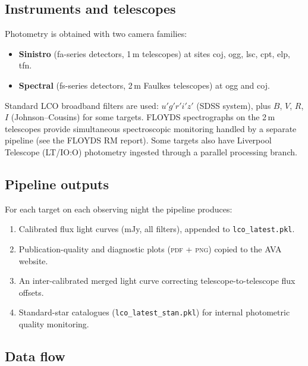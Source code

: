 \documentclass[12pt,a4paper]{article}
\begin{document}
\subsection{Instruments and telescopes}

Photometry is obtained with two camera families:
\begin{itemize}
  \item \textbf{Sinistro} (fa-series detectors, 1\,m telescopes) at sites coj, ogg, lsc,
        cpt, elp, tfn.
  \item \textbf{Spectral} (fs-series detectors, 2\,m Faulkes telescopes) at ogg and coj.
\end{itemize}
Standard LCO broadband filters are used: $u'g'r'i'z'$ (SDSS system), plus $B$, $V$, $R$,
$I$ (Johnson--Cousins) for some targets.  FLOYDS spectrographs on the 2\,m telescopes
provide simultaneous spectroscopic monitoring handled by a separate pipeline
(see the FLOYDS RM report).  Some targets also have Liverpool Telescope (LT/IO:O)
photometry ingested through a parallel processing branch.

\subsection{Pipeline outputs}

For each target on each observing night the pipeline produces:
\begin{enumerate}
  \item Calibrated flux light curves (mJy, all filters), appended to \texttt{lco\_latest.pkl}.
  \item Publication-quality and diagnostic plots (\textsc{pdf} + \textsc{png}) copied to the
        AVA website.
  \item An inter-calibrated merged light curve correcting telescope-to-telescope flux offsets.
  \item Standard-star catalogues (\texttt{lco\_latest\_stan.pkl}) for internal photometric
        quality monitoring.
\end{enumerate}

\subsection{Data flow}
\end{document}

